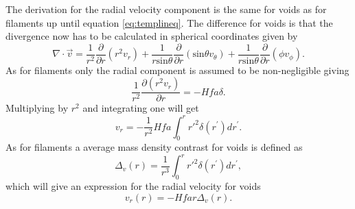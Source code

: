 The derivation for the radial velocity component is the same for voids as for
filaments up until equation \ref{eq:templineq}. The difference for voids is that
the divergence now has to be calculated in spherical coordinates given by
\begin{equation}
    \nabla\cdot \vec{v}=\frac{1}{r^2}\frac{\partial}{\partial r}(r^2v_r)
                       +\frac{1}{r\mathrm{sin}\theta}\frac{\partial}{\partial r}(\mathrm{sin}\theta v_\theta)
                       +\frac{1}{r\mathrm{sin}\theta}\frac{\partial}{\partial r}(\phi v_\phi).
\end{equation}
As for filaments only the radial component is assumed to be non-negligible
giving
\begin{equation}
    \frac{1}{r^2}\frac{\partial(r^2v_r)}{\partial r}=-Hfa\delta.
\end{equation}
Multiplying by $r^2$ and integrating one will get
\begin{equation}
    v_r = -\frac{1}{r^2}Hfa\int_0^r r\prime^2\delta(r^\prime)dr^\prime.
\end{equation}
As for filaments a average mass density contrast for voids is defined as
\begin{equation}\label{eq:contrastvoid}
    \Delta_v(r)=\frac{1}{r^3}\int_0^r r\prime^2\delta(r^\prime)dr^\prime,
\end{equation}
which will give an expression for the radial velocity for voids
\begin{equation}\label{eq:vrvoid}
    v_r(r)=-Hfar\Delta_v(r).
\end{equation}